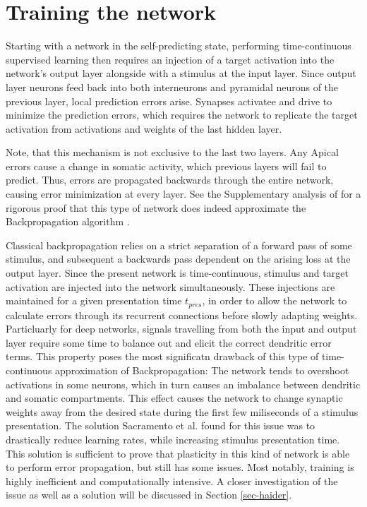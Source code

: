\section{Training the network}

Starting with a network in the self-predicting state, performing time-continuous supervised learning then requires an
injection of a target activation into the network's output layer alongside with a stimulus at the input layer. Since
output layer neurons feed back into both interneurons and pyramidal neurons of the previous layer, local prediction
errors arise. Synapses activatee and drive to minimize the prediction errors, which requires the network to replicate
the target activation from activations and weights of the last hidden layer.

Note, that this mechanism is not exclusive to the last two layers. Any Apical errors cause a change in somatic activity,
which previous layers will fail to predict. Thus, errors are propagated backwards through the entire network, causing
error minimization at every layer. See the Supplementary analysis of \cite{sacramento2018dendritic} for a rigorous proof
that this type of network does indeed approximate the Backpropagation algorithm .



Classical backpropagation relies on a strict separation of a forward pass of some stimulus, and subsequent a backwards
pass dependent on the arising loss at the output layer. Since the present network is time-continuous, stimulus and
target activation are injected into the network simultaneously. These injections are maintained for a given presentation
time $t_{pres}$, in order to allow the network to calculate errors through its recurrent connections before slowly
adapting weights. Particluarly for deep networks, signals travelling from both the input and output layer require some
time to balance out and elicit the correct dendritic error terms. This property poses the most significatn drawback of
this type of time-continuous approximation of Backpropagation: The network tends to overshoot activations in some
neurons, which in turn causes an imbalance between dendritic and somatic compartments. This effect causes the network to
change synaptic weights away from the desired state during the first few miliseconds of a stimulus presentation. The
solution Sacramento et al. found for this issue was to drastically reduce learning rates, while increasing stimulus
presentation time. This solution is sufficient to prove that plasticity in this kind of network is able to perform error
propagation, but still has some issues. Most notably, training is highly inefficient and computationally intensive. A
closer investigation of the issue as well as a solution will be discussed in Section \ref{sec-haider}.



